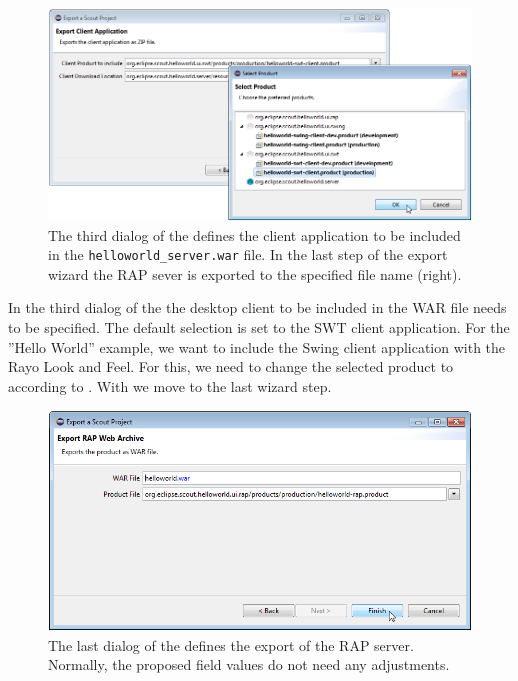 \documentclass[a4paper,10pt,twoside]{book}
\begin{document}
\begin{figure}
\includegraphics[width=13cm]{export_wizard_3.png}
\caption{The third dialog of the  defines the client application to be included in the \texttt{helloworld\_server.war} file.
In the last step of the export wizard the RAP sever is exported to the specified file name (right).}
\end{figure}

In the third dialog of the  the desktop client to be included in the WAR file needs to be specified.
The default selection is set to the SWT client application.
For the ''Hello World'' example, we want to include the Swing client application with the Rayo Look and Feel.
For this, we need to change the selected product to  according to .
With  we move to the last wizard step.

\begin{figure}
\includegraphics[width=12cm]{export_wizard_4.png}
\caption{The last dialog of the  defines the export of the RAP server.
Normally, the proposed field values do not need any adjustments.}
\end{figure}
\end{document}
